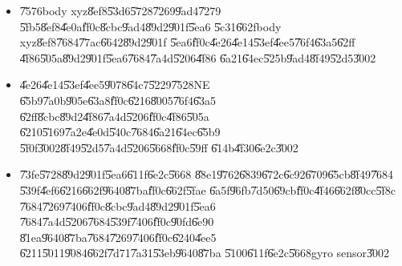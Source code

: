 \documentclass[12pt,a4paper]{article}
\begin{document}
\begin{itemize}
\item \U{7576}body xyz\U{8ef8}\U{53d6}\U{5728}\U{7269}\U{9ad4}\U{7279}%
\U{5fb5}\U{8ef8}\U{4e0a}\U{ff0c}\U{8cbc}\U{9ad4}\U{89d2}\U{901f}\U{5ea6}%
\U{5c31}\U{662f}body xyz\U{8ef8}\U{7684}\U{77ac}\U{6642}\U{89d2}\U{901f}%
\U{5ea6}\U{ff0c}\U{4e26}\U{4e14}\U{53ef}\U{4ee5}\U{76f4}\U{63a5}\U{62ff}%
\U{4f86}\U{505a}\U{89d2}\U{901f}\U{5ea6}\U{7684}\U{7a4d}\U{5206}\U{4f86}%
\U{6a21}\U{64ec}\U{525b}\U{9ad4}\U{8f49}\U{52d5}\U{3002}

\item \U{4e26}\U{4e14}\U{53ef}\U{4ee5}\U{9078}\U{64c7}\U{5229}\U{7528}NE%
\U{65b9}\U{7a0b}\U{905e}\U{63a8}\U{ff0c}\U{6216}\U{8005}\U{76f4}\U{63a5}%
\U{62ff}\U{8cbc}\U{89d2}\U{4f86}\U{7a4d}\U{5206}\U{ff0c}\U{4f86}\U{505a}%
\U{6210}\U{5169}\U{7a2e}\U{4e0d}\U{540c}\U{7684}\U{6a21}\U{64ec}\U{65b9}%
\U{5f0f}\U{3002}\U{8f49}\U{52d5}\U{7a4d}\U{5206}\U{5668}\U{ff0c}\U{59ff}%
\U{614b}\U{4f30}\U{6e2c}\U{3002}

\item \U{73fe}\U{5728}\U{89d2}\U{901f}\U{5ea6}\U{611f}\U{6e2c}\U{5668}%
\U{88e1}\U{9762}\U{6839}\U{672c}\U{6c92}\U{6709}\U{65cb}\U{8f49}\U{7684}%
\U{539f}\U{4ef6}\U{6216}\U{662f}\U{9640}\U{87ba}\U{ff0c}\U{662f}\U{5fae}%
\U{6a5f}\U{96fb}\U{7d50}\U{69cb}\U{ff0c}\U{4f46}\U{662f}\U{80cc}\U{5f8c}%
\U{7684}\U{7269}\U{7406}\U{ff0c}\U{8cbc}\U{9ad4}\U{89d2}\U{901f}\U{5ea6}%
\U{7684}\U{7a4d}\U{5206}\U{7684}\U{539f}\U{7406}\U{ff0c}\U{90fd}\U{6e90}%
\U{81ea}\U{9640}\U{87ba}\U{7684}\U{7269}\U{7406}\U{ff0c}\U{6240}\U{4ee5}%
\U{6211}\U{5011}\U{9084}\U{662f}\U{7d71}\U{7a31}\U{53eb}\U{9640}\U{87ba}%
\U{5100}\U{611f}\U{6e2c}\U{5668}gyro sensor\U{3002}
\end{itemize}

\bigskip 

%

\bigskip

%

%

%
\end{document}
